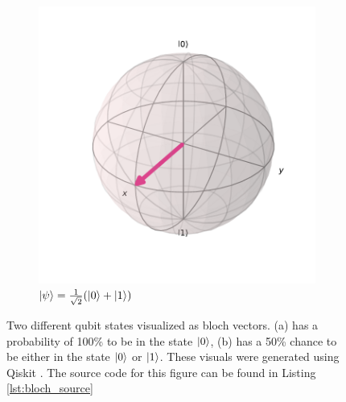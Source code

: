 \begin{figure}[H]
\begin{subfigure}{.35\textwidth}
				\includegraphics[width=0.95\linewidth]{figures/bloch_superposition.pdf}
				\caption{$\ket{\psi}=\frac{1}{\sqrt{2}}(\ket{0}+\ket{1})$}
			\end{subfigure}
			\caption{Two different qubit states visualized as bloch vectors. (a) has a probability of 100\% to be in the state $\ket{0}$, (b) has a 50\% chance to be either in the state $\ket{0}$ or $\ket{1}$. These visuals were generated using Qiskit \cite{qiskit2024}. The source code for this figure can be found in Listing \ref{lst:bloch_source}}
			\label{fig:bloch_qubits}
		\end{figure}
